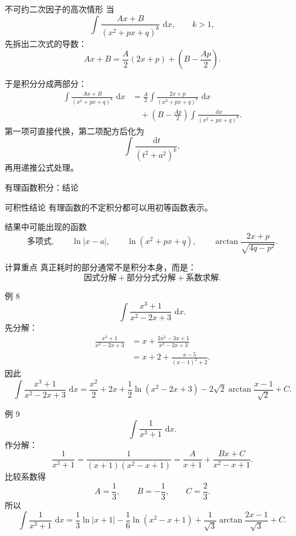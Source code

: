 \documentclass[aspectratio=169,10pt]{ctexbeamer}
\newcommand{\dd}{\,\mathrm{d}}
\begin{document}
\begin{frame}[t]{不可约二次因子的高次情形}
\small
当
\[
  \int \frac{Ax+B}{(x^2+px+q)^k}\,\dd x,\qquad k>1,
\]
先拆出二次式的导数：
\[
  Ax+B=\frac A2(2x+p)+\left(B-\frac{Ap}{2}\right).
\]

于是积分分成两部分：
\[
\begin{aligned}
\int \frac{Ax+B}{(x^2+px+q)^k}\,\dd x
&=\frac A2\int
\frac{2x+p}{(x^2+px+q)^k}\,\dd x\\
&\quad+\left(B-\frac{Ap}{2}\right)
\int\frac{\dd x}{(x^2+px+q)^k}.
\end{aligned}
\]
第一项可直接代换，第二项配方后化为
\[
  \int\frac{\dd t}{(t^2+a^2)^k},
\]
再用递推公式处理。
\end{frame}

\begin{frame}[t]{有理函数积分：结论}
\small
\begin{block}{可积性结论}
有理函数的不定积分都可以用初等函数表示。
\end{block}

\begin{block}{结果中可能出现的函数}
\[
\text{多项式},\qquad
\ln|x-a|,\qquad
\ln(x^2+px+q),\qquad
\arctan\frac{2x+p}{\sqrt{4q-p^2}}.
\]
\end{block}

\begin{alertblock}{计算重点}
真正耗时的部分通常不是积分本身，而是：
\[
  \text{因式分解}+\text{部分分式分解}+\text{系数求解}.
\]
\end{alertblock}
\end{frame}

\begin{frame}[t]{例 8}
\small
\[
  \int\frac{x^3+1}{x^2-2x+3}\,\dd x.
\]
先分解：
\[
\begin{aligned}
\frac{x^3+1}{x^2-2x+3}
&=x+\frac{2x^2-3x+1}{x^2-2x+3}\\
&=x+2+\frac{x-5}{(x-1)^2+2}.
\end{aligned}
\]
因此
\[
\boxed{
\int\frac{x^3+1}{x^2-2x+3}\,\dd x
=\frac{x^2}{2}+2x+\frac12\ln(x^2-2x+3)
-2\sqrt2\arctan\frac{x-1}{\sqrt2}+C.}
\]
\end{frame}

\begin{frame}[t]{例 9}
\small
\[
  \int\frac{1}{x^3+1}\,\dd x.
\]
作分解：
\[
  \frac1{x^3+1}
  =\frac1{(x+1)(x^2-x+1)}
  =\frac{A}{x+1}+\frac{Bx+C}{x^2-x+1}.
\]
比较系数得
\[
  A=\frac13,\qquad B=-\frac13,\qquad C=\frac23.
\]
所以
\[
\boxed{
\int\frac{1}{x^3+1}\,\dd x
=\frac13\ln|x+1|
-\frac16\ln(x^2-x+1)
+\frac1{\sqrt3}\arctan\frac{2x-1}{\sqrt3}+C.}
\]
\end{frame}
\end{document}
